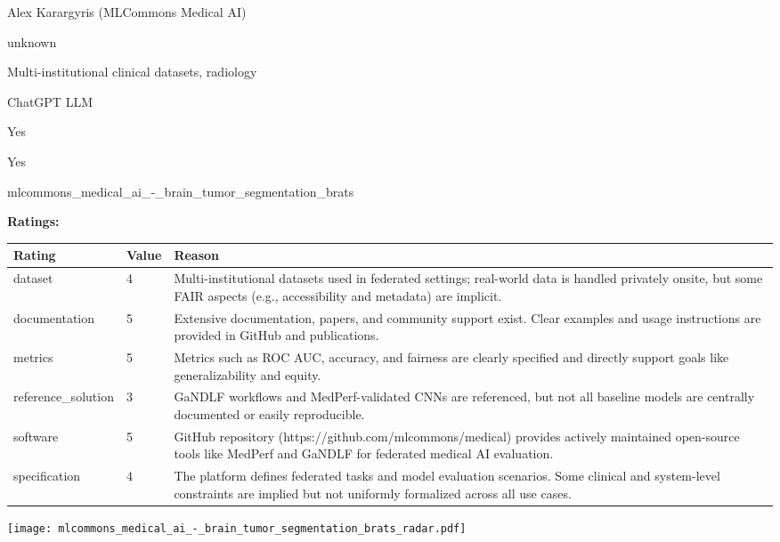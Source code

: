 {{\begin{description}[labelwidth=4cm, labelsep=1em, leftmargin=4cm, itemsep=0.1em, parsep=0em]
  \item[contact.name:] Alex Karargyris (MLCommons Medical AI)
  \item[contact.email:] unknown
  \item[datasets.links.name:] Multi-institutional clinical datasets, radiology
  \item[results.links.name:] ChatGPT LLM
  \item[fair.reproducible:] Yes
  \item[fair.benchmark\_ready:] Yes
  \item[id:] mlcommons\_medical\_ai\_-\_brain\_tumor\_segmentation\_brats
  \item[Citations:] \cite{karargyris2023federated}
\end{description}

{\bf Ratings:} ~ \\

\begin{tabular}{p{} p{} p{}}
\hline
Rating & Value & Reason \\
\hline
dataset & 4 & Multi-institutional datasets used in federated settings; real-world data is handled
privately onsite, but some FAIR aspects (e.g., accessibility and metadata) are implicit.
 \\
documentation & 5 & Extensive documentation, papers, and community support exist. Clear examples and usage
instructions are provided in GitHub and publications.
 \\
metrics & 5 & Metrics such as ROC AUC, accuracy, and fairness are clearly specified and directly
support goals like generalizability and equity.
 \\
reference\_solution & 3 & GaNDLF workflows and MedPerf-validated CNNs are referenced, but not all baseline models
are centrally documented or easily reproducible.
 \\
software & 5 & GitHub repository (https://github.com/mlcommons/medical) provides actively maintained
open-source tools like MedPerf and GaNDLF for federated medical AI evaluation.
 \\
specification & 4 & The platform defines federated tasks and model evaluation scenarios. Some clinical and
system-level constraints are implied but not uniformly formalized across all use cases.
 \\
\hline
\end{tabular}

\texttt{[image: mlcommons\_medical\_ai\_-\_brain\_tumor\_segmentation\_brats\_radar.pdf]}
}}
\clearpage